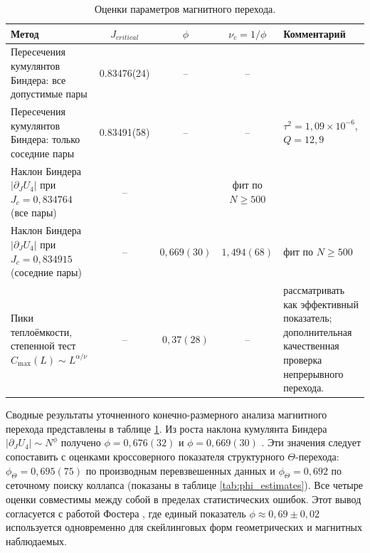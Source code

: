     
     \begin{table}[ht]
    	\centering
    	\small
    	\setlength{\tabcolsep}{4pt}
    	\renewcommand{\arraystretch}{1.15}
    	
    	\begin{tabularx}{\textwidth}{
    			>{\raggedright\arraybackslash}p{5.2cm}
    			c
    			c
    			c
    			>{\raggedright\arraybackslash}X
    		}
    		\toprule
    		Метод & $J_{critical}$ & $\phi$ & $\nu_c=1/\phi$ & Комментарий \\
    		\midrule
    		Пересечения кумулянтов Биндера: все допустимые пары 
    		& 0.83476(24) & -- & -- 
    		&   \\
    		Пересечения кумулянтов Биндера: только соседние пары 
    		& 0.83491(58) & -- & -- 
    		& $\tau^2=1{,}09\!\times\!10^{-6}$, $Q=12{,}9$ \\
    		Наклон Биндера $|\partial_J U_4|$ при $J_c=0{,}834764$ (все пары)  
    		& -- &  
    		& фит по $N\ge 500$ \\
    		Наклон Биндера $|\partial_J U_4|$ при $J_c=0{,}834915$ (соседние пары) 
    		& -- & $0{,}669(30)$ & $1{,}494(68)$ 
    		& фит по $N\ge 500$ \\
    		Пики теплоёмкости, степенной тест $C_{\max}(L)\sim L^{\alpha/\nu}$ 
    		& -- & $0{,}37(28)$ & -- 
    		& рассматривать как эффективный показатель;  дополнительная качественная   проверка непрерывного перехода. \\
    		\bottomrule
    	\end{tabularx}
    	
    	\caption{Оценки параметров магнитного перехода.}
    	\label{tab:magnetic_exponents}
    \end{table} 
    
    Сводные результаты уточненного конечно-размерного анализа магнитного перехода представлены  в таблице \ref{tab:magnetic_exponents}.  Из роста наклона кумулянта Биндера $|\partial_J U_4| \sim N^\phi$ 
 получено $\phi = 0{,}676(32)$ 
    и $\phi = 0{,}669(30)$ . Эти значения следует сопоставить с оценками кроссоверного показателя 
    структурного $\Theta$-перехода: $\phi_\Theta = 0{,}695(75)$ 
    по производным перевзвешенных данных и $\phi_\Theta = 0{,}692$ 
    по сеточному поиску коллапса (показаны в таблице \ref{tab:phi_estimates}). Все четыре оценки совместимы между собой в пределах статистических ошибок. 
    Этот вывод согласуется с работой Фостера \cite{PhysRevE.104.024122}, 
    где единый показатель $\phi \approx 0{,}69 \pm 0{,}02$ 
    используется одновременно для скейлинговых форм геометрических 
    и магнитных наблюдаемых. 
    
